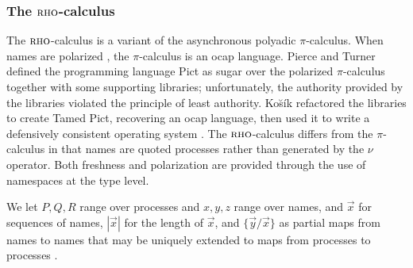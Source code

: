 \documentclass[]{acm_proc_article-sp}
\makeatletter
\newcommand{\id}[1]{\texttt{#1}}
\newcommand{\pzero}{\mathbin{0}}
\newcommand{\juxtap}{\mathbin{\id{|}}}
\newcommand{\bc}{\mathbin{\mathbf{::=}}}
\newcommand{\bm}{\mathbin{\mathbf\mid}}
\newlength{\ltext}
\newlength{\lmath}
\newlength{\cmath}
\newlength{\rmath}
\newlength{\rtext}
\newenvironment{grammar}{
  \[
  \begin{array}{l@{\quad}rcl@{\quad}l}
  \hspace{\ltext} & \hspace{\lmath} & \hspace{\cmath} & \hspace{\rmath} & \hspace{\rtext} \\
}{
  \end{array}\]
}
\numberwithin{equation}{subsection}
\newcommand{\pic}{$\pi$-calculus}
\newcommand{\rhoc}{${\textsc{rho}}$-calculus}
\makeatother
\begin{document}
\subsubsection{The \rhoc}

The {\rhoc} \cite{DBLP:journals/entcs/MeredithR05}
is a variant of the asynchronous polyadic {\pic}.  When names are
polarized \cite{conf/fsttcs/Odersky95}, the {\pic} is an ocap
language.  Pierce and Turner \cite{PierceTurner:PictDesign}
defined the programming language Pict as sugar over the polarized {\pic}
together with some supporting libraries; unfortunately, the authority
provided by the libraries violated the principle of least authority.
Ko\u{s}\'{i}k refactored the libraries to create Tamed Pict, recovering
an ocap language, then used it to write a defensively consistent
operating system \cite{kosik:dep}. The {\rhoc} differs from the 
{\pic} in that names are quoted processes
rather than generated by the $\nu$ operator.  Both freshness and 
polarization are provided through the use of namespaces at the type level.

We let ${P, Q, R}$ range over processes and ${x, y, z}$ range over
names, and $\vec{x}$ for sequences of names, $|\vec{x}|$ for the
length of $\vec{x}$, and $\{ \vec{y} / \vec{x} \}$ as partial maps from
names to names that may be uniquely extended to maps from processes to
processes \cite{DBLP:journals/entcs/MeredithR05}.

\end{document}

